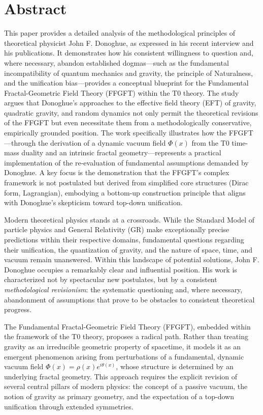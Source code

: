 	
\section*{Abstract}
		This paper provides a detailed analysis of the methodological principles of theoretical physicist John F. Donoghue, as expressed in his recent interview \cite{DonoghueInterview2025} and his publications. It demonstrates how his consistent willingness to question and, where necessary, abandon established dogmas—such as the fundamental incompatibility of quantum mechanics and gravity, the principle of Naturalness, and the unification bias—provides a conceptual blueprint for the Fundamental Fractal-Geometric Field Theory (FFGFT) within the T0 theory. The study argues that Donoghue's approaches to the effective field theory (EFT) of gravity, quadratic gravity, and random dynamics not only permit the theoretical revisions of the FFGFT but even necessitate them from a methodologically conservative, empirically grounded position. The work specifically illustrates how the FFGFT—through the derivation of a dynamic vacuum field $\Phi(x)$ from the T0 time-mass duality and an intrinsic fractal geometry—represents a practical implementation of the re-evaluation of fundamental assumptions demanded by Donoghue. A key focus is the demonstration that the FFGFT's complex framework is not postulated but derived from simplified core structures (Dirac form, Lagrangian), embodying a bottom-up construction principle that aligns with Donoghue's skepticism toward top-down unification.

	
	
	
	Modern theoretical physics stands at a crossroads. While the Standard Model of particle physics and General Relativity (GR) make exceptionally precise predictions within their respective domains, fundamental questions regarding their unification, the quantization of gravity, and the nature of space, time, and vacuum remain unanswered. Within this landscape of potential solutions, John F. Donoghue occupies a remarkably clear and influential position. His work is characterized not by spectacular new postulates, but by a consistent \emph{methodological revisionism}: the systematic questioning and, where necessary, abandonment of assumptions that prove to be obstacles to consistent theoretical progress.
	
	The Fundamental Fractal-Geometric Field Theory (FFGFT), embedded within the framework of the T0 theory, proposes a radical path. Rather than treating gravity as an irreducible geometric property of spacetime, it models it as an emergent phenomenon arising from perturbations of a fundamental, dynamic vacuum field $\Phi(x) = \rho(x) e^{i\theta(x)}$, whose structure is determined by an underlying fractal geometry. This approach requires the explicit revision of several central pillars of modern physics: the concept of a passive vacuum, the notion of gravity as primary geometry, and the expectation of a top-down unification through extended symmetries.
	

